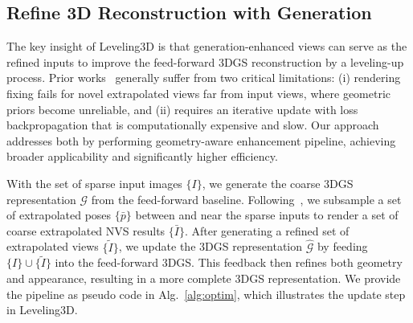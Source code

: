 
\subsection{Refine 3D Reconstruction with Generation}
The key insight of Leveling3D is that generation-enhanced views can serve as the refined inputs to improve the feed-forward 3DGS reconstruction by a leveling-up process. Prior works~\cite{wu2025difix3d+, wei2025gsfix3d, yin2025gsfixer, viewextrapolator} generally suffer from two critical limitations: (i) rendering fixing fails for novel extrapolated views far from input views, where geometric priors become unreliable, and (ii) requires an iterative update with loss backpropagation that is computationally expensive and slow. Our approach addresses both by performing geometry-aware enhancement pipeline, achieving broader applicability and significantly higher efficiency.

With the set of sparse input images $\{I\}$, we generate the coarse 3DGS representation $\mathcal{G}$ from the feed-forward baseline. Following~\cite{zhong2025taming}, we subsample a set of extrapolated poses $\{\bar{p}\}$ between and near the sparse inputs to render a set of coarse extrapolated NVS results $\{\bar{I}\}$. After generating a refined set of extrapolated views $\{\tilde{I}\}$, we update the 3DGS representation $\hat{\mathcal{G}}$ by feeding $\{I\} \cup \{\tilde{I}\}$ into the feed-forward 3DGS. This feedback then refines both geometry and appearance, resulting in a more complete 3DGS representation. We provide the pipeline as pseudo code in Alg.~\ref{alg:optim}, which illustrates the update step in Leveling3D.




